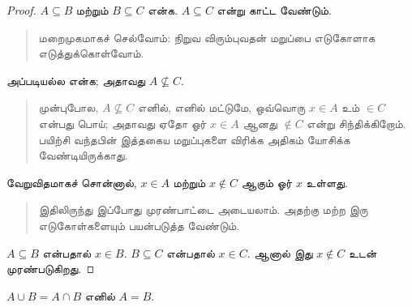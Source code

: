 \documentclass[../../../include/open-logic-section]{subfiles}
\begin{document}
\begin{proof}
  $A \subseteq B$ மற்றும் $B \subseteq C$
  என்க. $A \subseteq C$ என்று காட்ட வேண்டும்.
  \begin{quote}
    மறைமுகமாகச் செல்வோம்: நிறுவ விரும்புவதன்
    மறுப்பை எடுகோளாக எடுத்துக்கொள்வோம்.
  \end{quote}
  அப்படியல்ல என்க; அதாவது $A \nsubseteq C$.
  \begin{quote}
    முன்புபோல, $A \nsubseteq C$ எனில்,
    எனில் மட்டுமே, ஒவ்வொரு $x \in A$ உம்
    $\in C$ என்பது பொய்; அதாவது ஏதோ ஓர்
    $x \in A$ ஆனது $\notin C$ என்று
    சிந்திக்கிறோம். பயிற்சி வந்தபின் இத்தகைய
    மறுப்புகளை விரிக்க அதிகம் யோசிக்க வேண்டியிருக்காது.
  \end{quote}
  வேறுவிதமாகச் சொன்னால், $x \in A$ மற்றும்
  $x \notin C$ ஆகும் ஓர் $x$ உள்ளது.
  \begin{quote}
    இதிலிருந்து இப்போது முரண்பாட்டை அடையலாம்.
    அதற்கு மற்ற இரு எடுகோள்களையும் பயன்படுத்த வேண்டும்.
  \end{quote}
  $A \subseteq B$ என்பதால் $x \in B$.
  $B \subseteq C$ என்பதால் $x \in C$.
  ஆனால் இது $x \notin C$ உடன் முரண்படுகிறது.
\end{proof}

\begin{prop}
$A \cup B = A \cap B$ எனில் $A = B$.
\end{prop}
\end{document}
